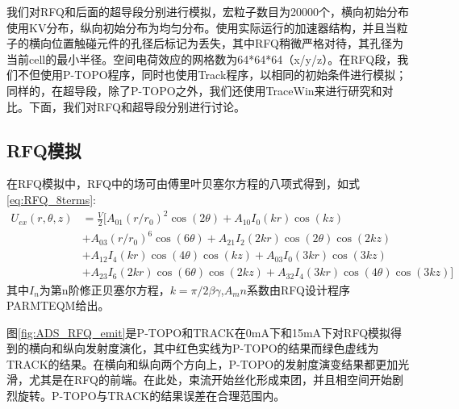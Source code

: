我们对RFQ和后面的超导段分别进行模拟，宏粒子数目为20000个，横向初始分布使用KV分布，纵向初始分布为均匀分布。使用实际运行的加速器结构，并且当粒子的横向位置触碰元件的孔径后标记为丢失，其中RFQ稍微严格对待，其孔径为当前cell的最小半径。空间电荷效应的网格数为64*64*64（x/y/z）。在RFQ段，我们不但使用P-TOPO程序，同时也使用Track程序\cite{aseev2005track}，以相同的初始条件进行模拟；同样的，在超导段，除了P-TOPO之外，我们还使用TraceWin\cite{uriot2014tracewin}来进行研究和对比。下面，我们对RFQ和超导段分别进行讨论。

\subsection{RFQ模拟}
在RFQ模拟中，RFQ中的场可由傅里叶贝塞尔方程的八项式得到，如式\ref{eq:RFQ_8terms}:
\begin{equation}
    \begin{aligned}
       {{U}_{ex}}(r,\theta ,z) & =\frac{V}{2}[{{A}_{01}}{{(r/{{r}_{0}})}^{2}}\cos (2\theta )+{{A}_{10}}{{I}_{0}}(kr)\cos (kz) \\
     & +{{A}_{03}}{{(r/{{r}_{0}})}^{6}}\cos (6\theta )+{{A}_{21}}{{I}_{2}}(2kr)\cos (2\theta )\cos (2kz) \\
     & +{{A}_{12}}{{I}_{4}}(kr)\cos (4\theta )\cos (kz)+{{A}_{03}}{{I}_{0}}(3kr)\cos (3kz) \\
     & +{{A}_{23}}{{I}_{6}}(2kr)\cos (6\theta )\cos (2kz)+{{A}_{32}}{{I}_{4}}(3kr)\cos (4\theta )\cos (3kz)]
    \end{aligned}
    \label{eq:RFQ_8terms}
\end{equation}
其中$I_n$为第n阶修正贝塞尔方程，$k=\pi /2\beta \gamma$,$A_mn$系数由RFQ设计程序PARMTEQM给出。

图\ref{fig:ADS_RFQ_emit}是P-TOPO和TRACK在0mA下和15mA下对RFQ模拟得到的横向和纵向发射度演化，其中红色实线为P-TOPO的结果而绿色虚线为TRACK的结果。在横向和纵向两个方向上，P-TOPO的发射度演变结果都更加光滑，尤其是在RFQ的前端。在此处，束流开始丝化形成束团，并且相空间开始剧烈旋转。P-TOPO与TRACK的结果误差在合理范围内。

